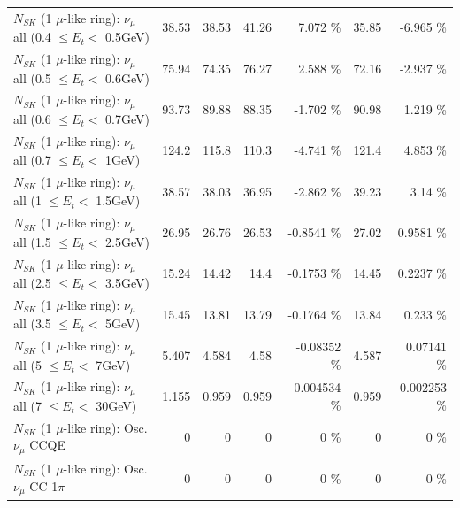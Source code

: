 \begin{table}
\begin{tabular}{| l | r | r | r  r | r  r |}
       $N_{SK}$ (1 $\mu$-like ring): $\nu_{\mu}$ all (0.4 $\leq E_{t} <$ 0.5GeV) &           38.53 &           38.53 &           41.26 &    7.072 \%  &           35.85 &   -6.965 \%  \\ 
       $N_{SK}$ (1 $\mu$-like ring): $\nu_{\mu}$ all (0.5 $\leq E_{t} <$ 0.6GeV) &           75.94 &           74.35 &           76.27 &    2.588 \%  &           72.16 &   -2.937 \%  \\ 
       $N_{SK}$ (1 $\mu$-like ring): $\nu_{\mu}$ all (0.6 $\leq E_{t} <$ 0.7GeV) &           93.73 &           89.88 &           88.35 &   -1.702 \%  &           90.98 &    1.219 \%  \\ 
         $N_{SK}$ (1 $\mu$-like ring): $\nu_{\mu}$ all (0.7 $\leq E_{t} <$ 1GeV) &           124.2 &           115.8 &           110.3 &   -4.741 \%  &           121.4 &    4.853 \%  \\ 
         $N_{SK}$ (1 $\mu$-like ring): $\nu_{\mu}$ all (1 $\leq E_{t} <$ 1.5GeV) &           38.57 &           38.03 &           36.95 &   -2.862 \%  &           39.23 &     3.14 \%  \\ 
       $N_{SK}$ (1 $\mu$-like ring): $\nu_{\mu}$ all (1.5 $\leq E_{t} <$ 2.5GeV) &           26.95 &           26.76 &           26.53 &  -0.8541 \%  &           27.02 &   0.9581 \%  \\ 
       $N_{SK}$ (1 $\mu$-like ring): $\nu_{\mu}$ all (2.5 $\leq E_{t} <$ 3.5GeV) &           15.24 &           14.42 &            14.4 &  -0.1753 \%  &           14.45 &   0.2237 \%  \\ 
         $N_{SK}$ (1 $\mu$-like ring): $\nu_{\mu}$ all (3.5 $\leq E_{t} <$ 5GeV) &           15.45 &           13.81 &           13.79 &  -0.1764 \%  &           13.84 &    0.233 \%  \\ 
           $N_{SK}$ (1 $\mu$-like ring): $\nu_{\mu}$ all (5 $\leq E_{t} <$ 7GeV) &           5.407 &           4.584 &            4.58 & -0.08352 \%  &           4.587 &  0.07141 \%  \\ 
          $N_{SK}$ (1 $\mu$-like ring): $\nu_{\mu}$ all (7 $\leq E_{t} <$ 30GeV) &           1.155 &           0.959 &           0.959 & -0.004534 \%  &           0.959 & 0.002253 \%  \\ 
\hline
\hline
                               $N_{SK}$ (1 $\mu$-like ring): Osc. $\nu_\mu$ CCQE &               0 &               0 &               0 &        0 \%  &               0 &        0 \%  \\ 
                          $N_{SK}$ (1 $\mu$-like ring): Osc. $\nu_\mu$ CC 1$\pi$ &               0 &               0 &               0 &        0 \%  &               0 &        0 \%  \\ 

\end{tabular}
\end{table}
